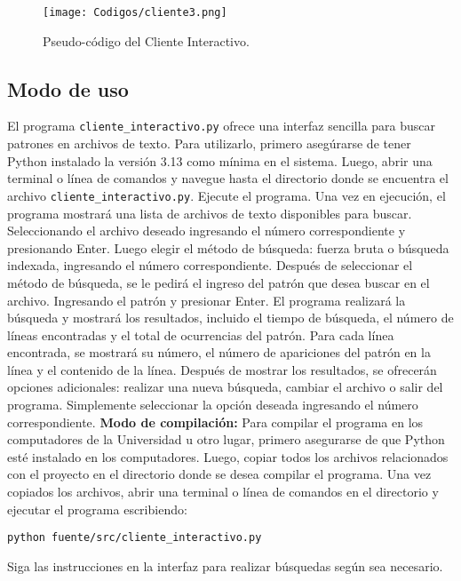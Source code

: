 \documentclass[12pt, twoside]{article}
\begin{document}
\begin{figure}[H]
  \centering
  \texttt{[image: Codigos/cliente3.png]}
  \caption{Pseudo-código del Cliente Interactivo.}
\end{figure}
\newpage




\subsection{Modo de uso}
El programa \texttt{cliente\_interactivo.py} ofrece una interfaz sencilla para buscar patrones en archivos de texto. Para utilizarlo, primero asegúrarse de tener Python instalado la versión 3.13 como mínima en el sistema. Luego, abrir una terminal o línea de comandos y navegue hasta el directorio donde se encuentra el archivo \texttt{cliente\_interactivo.py}. Ejecute el programa.
\newline
\newline
Una vez en ejecución, el programa mostrará una lista de archivos de texto disponibles para buscar. Seleccionando el archivo deseado ingresando el número correspondiente y presionando Enter. Luego elegir el método de búsqueda: fuerza bruta o búsqueda indexada, ingresando el número correspondiente.
\newline
\newline
Después de seleccionar el método de búsqueda, se le pedirá el ingreso del patrón que desea buscar en el archivo. Ingresando el patrón y presionar Enter. El programa realizará la búsqueda y mostrará los resultados, incluido el tiempo de búsqueda, el número de líneas encontradas y el total de ocurrencias del patrón. Para cada línea encontrada, se mostrará su número, el número de apariciones del patrón en la línea y el contenido de la línea.
\newline
\newline
Después de mostrar los resultados, se ofrecerán opciones adicionales: realizar una nueva búsqueda, cambiar el archivo o salir del programa. Simplemente seleccionar la opción deseada ingresando el número correspondiente.
\newline
\newline
\noindent\textbf{Modo de compilación:}
\newline
\newline
Para compilar el programa en los computadores de la Universidad u otro lugar, primero asegurarse de que Python esté instalado en los computadores. Luego, copiar todos los archivos relacionados con el proyecto en el directorio donde se desea compilar el programa.
\newline
\newline
Una vez copiados los archivos, abrir una terminal o línea de comandos en el directorio y ejecutar el programa escribiendo: \begin{verbatim}
python fuente/src/cliente_interactivo.py
\end{verbatim} Siga las instrucciones en la interfaz para realizar búsquedas según sea necesario.
\newpage
\end{document}
